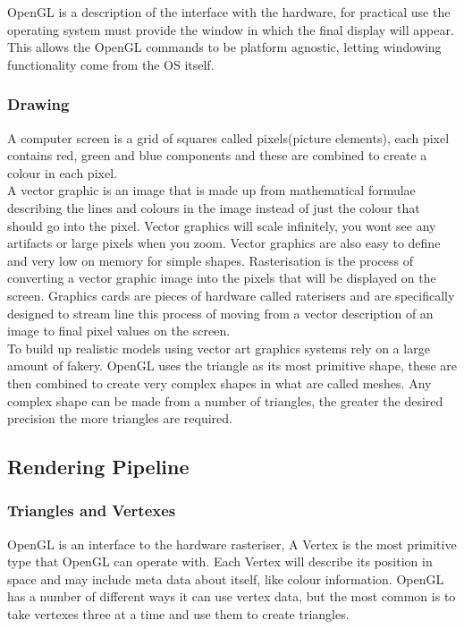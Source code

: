 OpenGL is a description of the interface with the hardware, for 
practical use the operating system must provide the window in which the final
display will appear. This allows the OpenGL commands to be platform agnostic, 
letting windowing functionality come from the OS itself.\\

\subsubsection*{Drawing}
A computer screen is a grid of squares called pixels(picture elements), each
pixel contains red, green and blue components and these are combined to create a 
colour in each pixel. \\

A vector graphic is an image that is made up from mathematical formulae describing
the lines and colours in the image instead of just the colour that should go into the
pixel. Vector graphics
will scale infinitely, you wont see any 
artifacts or large pixels when you zoom. Vector graphics are also easy to define
and very low on memory for simple shapes. 
Rasterisation is the process of converting a vector 
graphic image into the pixels that will be displayed on the screen. 
Graphics cards are 
pieces of hardware called raterisers and are specifically designed to stream line
this process of moving from a vector description of an image to final pixel 
values on the screen.\\

To build up realistic models using vector art graphics systems rely on a large
amount of fakery. OpenGL uses the triangle as its most primitive shape, these
are then combined to create very complex shapes in what are called 
meshes. Any complex shape can be made from a number of triangles, the greater the
desired precision the more triangles are required.\\

\subsection{Rendering Pipeline}
\subsubsection{Triangles and Vertexes}
OpenGL is an interface to the hardware rasteriser, A Vertex is the most 
primitive type that OpenGL can operate with. Each Vertex will describe its 
position in space and may include meta data about itself, like colour 
information. OpenGL has a number of different ways it can use vertex data, but 
the most common is to take vertexes three at a time and use them to create 
triangles.\\

